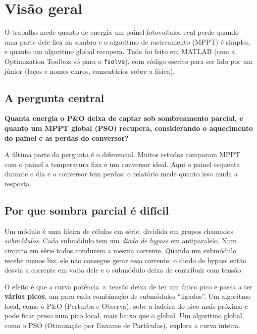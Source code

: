 \section{Vis\~ao geral}\label{sec:visao}

O trabalho mede quanto de energia um painel fotovoltaico real perde quando uma parte dele
fica na sombra e o algoritmo de rastreamento (MPPT) \'e simples, e quanto um algoritmo global
recupera. Tudo foi feito em MATLAB (com a Optimization Toolbox s\'o para o \texttt{fsolve}), com c\'odigo escrito para ser lido por
um j\'unior (laços e nomes claros, coment\'arios sobre a f\'isica).

\subsection{A pergunta central}

\begin{resumo}
\textbf{Quanta energia o P\&O deixa de captar sob sombreamento parcial, e quanto um MPPT
global (PSO) recupera, considerando o aquecimento do painel e as perdas do conversor?}
\end{resumo}

A \'ultima parte da pergunta \'e o diferencial. Muitos estudos comparam MPPT com o painel a
temperatura fixa e um conversor ideal. Aqui o painel esquenta durante o dia e o conversor tem
perdas; o relat\'orio mede quanto isso muda a resposta.

\subsection{Por que sombra parcial \'e dif\'icil}

Um m\'odulo \'e uma fileira de c\'elulas em s\'erie, dividida em grupos chamados
\emph{subm\'odulos}. Cada subm\'odulo tem um \emph{diodo de bypass} em antiparalelo. Num
circuito em s\'erie todos conduzem a mesma corrente. Quando um subm\'odulo recebe menos luz, ele
n\~ao consegue gerar essa corrente; o diodo de bypass ent\~ao desvia a corrente em volta dele e
o subm\'odulo deixa de contribuir com tens\~ao.

O efeito \'e que a curva pot\^encia $\times$ tens\~ao deixa de ter um \'unico pico e passa a ter
\textbf{v\'arios picos}, um para cada combina\c{c}\~ao de subm\'odulos ``ligados''. Um algoritmo
local, como o P\&O (Perturba e Observa), sobe a ladeira do pico mais pr\'oximo e pode ficar preso
num pico local, mais baixo que o global. Um algoritmo global, como o PSO (Otimiza\c{c}\~ao por
Enxame de Part\'iculas), explora a curva inteira.

